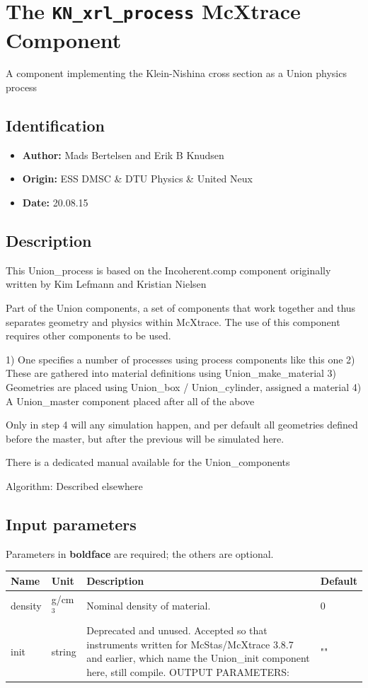 \section{The \texttt{KN\_xrl\_process} McXtrace Component}
A component implementing the Klein-Nishina cross section as a Union physics process

\subsection*{Identification}
\begin{itemize}
  \item \textbf{Author:} Mads Bertelsen and Erik B Knudsen
  \item \textbf{Origin:} ESS DMSC \& DTU Physics \& United Neux
  \item \textbf{Date:} 20.08.15
\end{itemize}

\subsection*{Description}
This Union\_process is based on the Incoherent.comp component originally written by Kim Lefmann and Kristian Nielsen

Part of the Union components, a set of components that work together and thus separates geometry and physics within McXtrace. The use of this component requires other components to be used.

1) One specifies a number of processes using process components like this one 2) These are gathered into material definitions using Union\_make\_material 3) Geometries are placed using Union\_box / Union\_cylinder, assigned a material 4) A Union\_master component placed after all of the above

Only in step 4 will any simulation happen, and per default all geometries defined before the master, but after the previous will be simulated here.

There is a dedicated manual available for the Union\_components

Algorithm: Described elsewhere

\subsection*{Input parameters}
Parameters in \textbf{boldface} are required; the others are optional.

\begin{longtable}{p{}p{}p{}p{}}
\toprule
\textbf{Name} & \textbf{Unit} & \textbf{Description} & \textbf{Default} \\
\midrule
\endhead
density & g/cm$^{3}$ & Nominal density of material. & 0 \\
init & string & Deprecated and unused. Accepted so that instruments written for McStas/McXtrace 3.8.7 and earlier, which name the Union\_init component here, still compile. OUTPUT PARAMETERS: & "" \\
\bottomrule
\end{longtable}

